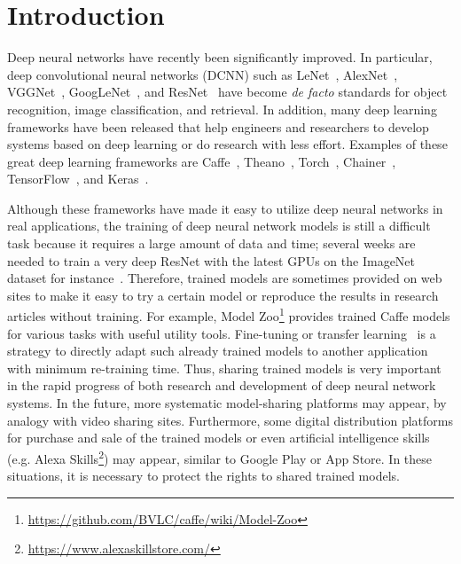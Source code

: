 \documentclass[10pt,twocolumn,letterpaper]{article}
\begin{document}
\section{Introduction}
Deep neural networks have recently been significantly improved.
In particular, deep convolutional neural networks (DCNN) such as LeNet~\cite{lec_ieee98}, AlexNet~\cite{kri_nips12}, VGGNet~\cite{Simonyan_iclr15}, GoogLeNet~\cite{Szegedy_cvpr15}, and ResNet~\cite{He_cvpr16} have become \textit{de facto} standards for object recognition, image classification, and retrieval.
In addition, many deep learning frameworks have been released that help engineers and researchers to develop systems based on deep learning or do research with less effort.
Examples of these great deep learning frameworks are
Caffe~\cite{jia_mm14},
Theano~\cite{bergstra_scipy10},
Torch~\cite{collobert_nipsw11},
Chainer~\cite{tokui_nipsw15},
TensorFlow~\cite{abadi_arxiv16},
and Keras~\cite{chollet_github15}.

Although these frameworks have made it easy to utilize deep neural networks in real applications, the training of deep neural network models is still a difficult task because it requires a large amount of data and time; several weeks are needed to train a very deep ResNet with the latest GPUs on the ImageNet dataset for instance~\cite{He_cvpr16}.
Therefore, trained models are sometimes provided on web sites to make it easy to try a certain model or reproduce the results in research articles without training.
For example, Model Zoo\footnote{\url{https://github.com/BVLC/caffe/wiki/Model-Zoo}} provides trained Caffe models for various tasks with useful utility tools.
Fine-tuning or transfer learning~\cite{Simonyan_iclr15} is a strategy to directly adapt such already trained models to another application with minimum re-training time.
Thus, sharing trained models is very important in the rapid progress of both research and development of deep neural network systems.
In the future, more systematic model-sharing platforms may appear, by analogy with video sharing sites.
Furthermore, some digital distribution platforms for purchase and sale of the trained models or even artificial intelligence skills (e.g. Alexa Skills\footnote{\url{https://www.alexaskillstore.com/}}) may appear, similar to Google Play or App Store.
In these situations, it is necessary to protect the rights to shared trained models.
\end{document}
